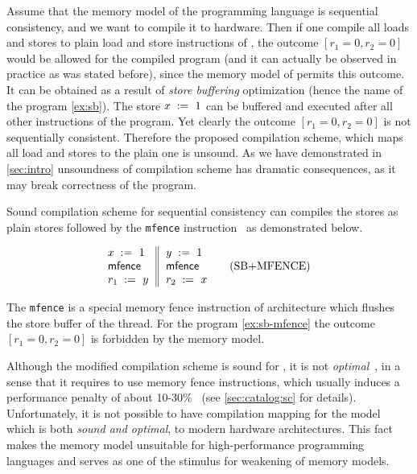 Assume that the memory model of the programming language
is sequential consistency, and we want 
to compile it to \Intel hardware. 
Then if one compile all loads and stores 
to plain load and store instructions of \Intel,
the outcome $[r_1=0, r_2=0]$ would be 
allowed for the compiled program 
(and it can actually be observed in practice as was stated before), 
since the memory model of \Intel permits this outcome. 
It can be obtained as a result of \emph{store buffering}
optimization (hence the name of the program \ref{ex:sb}). 
The store $x\;:=_{}\;1$ can be buffered and 
executed after all other instructions of the program.  
Yet clearly the outcome $[r_1=0, r_2=0]$ is not sequentially consistent. 
Therefore the proposed compilation scheme, 
which maps all load and stores to the plain one is unsound. 
As we have demonstrated in \cref{sec:intro} 
unsoundness of compilation scheme has 
dramatic consequences, as it may break 
correctness of the program. 

Sound compilation scheme for sequential consistency 
can compiles the stores as plain stores followed 
by the \texttt{mfence} instruction~\cite{Sewell-al:CACM10, Batty-al:POPL11} 
as demonstrated below. 

\begin{equation*}
\inarrII{
   \writeInst{}{x}{1}   \\
   \mfenceInst          \\
   \readInst{}{r_1}{y}  \\
}{
  \writeInst{}{y}{1}   \\
  \mfenceInst          \\
  \readInst{}{r_2}{x}  \\
}
\tag{SB+MFENCE}\label{ex:sb-mfence}
\end{equation*}


The \texttt{mfence} is a special memory fence instruction
of \Intel architecture which flushes the store buffer of the thread. 
For the program \ref{ex:sb-mfence} the outcome $[r_1=0, r_2=0]$
is forbidden by the \Intel memory model. 

Although the modified compilation scheme is sound for \SC, 
it is not \emph{optimal}~\cite{OptimalCompilationCPP}, 
in a sense that it requires to use memory fence instructions, 
which usually induces a performance penalty
of about 10-30\%~\cite{Marino-al:PLDI11, Liu-al:OOPSLA17}
(see \cref{sec:catalog:sc} for details).
Unfortunately, it is not possible to have compilation mapping 
for the \SC model which is both \emph{sound and optimal}, 
to modern hardware architectures.     
This fact makes the \SC memory model unsuitable  
for high-performance programming languages
and serves as one of the stimulus for 
weakening of memory models. 
 
